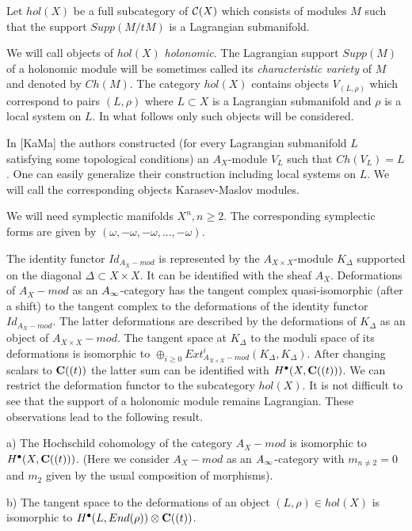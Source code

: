 \documentclass[a4paper,12pt]{article}
\begin{document}
Let $hol(X)$ be a full subcategory of ${\cal C}(X)$
which consists of modules $M$ such that the support $Supp(M/tM)$ is
a Lagrangian submanifold.

We will call objects of $hol(X)$ 
{\it holonomic}.
The Lagrangian support $Supp(M)$ of a holonomic module will be sometimes called its
{\it characteristic
variety} of $M$ and denoted by $Ch(M)$. The 
category $hol(X)$  contains
objects  $V_{(L,\rho)}$ which correspond to pairs
$(L,\rho)$ where $L\subset X$ is a Lagrangian submanifold and
$\rho$ is a local system on $L$. In what follows only such objects
will be considered. 

\begin{rmk}
 In [KaMa] the authors constructed (for every Lagrangian submanifold $L$ satisfying
some topological conditions)
an $A_X$-module $V_L$ such that $Ch(V_L)=L$. 
One can easily generalize their construction including local systems on $L$.
We will call the corresponding objects
Karasev-Maslov modules.

\end{rmk}

We will  need symplectic manifolds $X^n, n\ge 2$. The corresponding symplectic forms
are given by $(\omega,-\omega,-\omega,...,-\omega)$.


The identity functor $Id_{A_X-mod}$ is represented by the  $A_{X\times X}$-module
$K_{\Delta}$  supported on the diagonal $\Delta\subset X\times X$.
It can be  identified with the sheaf  $A_X$.
Deformations of $A_X-mod$ as an $A_{\infty}$-category has the tangent complex
quasi-isomorphic (after a shift) to the tangent
complex to the  deformations of the identity functor $Id_{A_X-mod}$.
The latter deformations are described by the deformations
of $K_{\Delta}$ as an object of $A_{X\times X}-mod$.  The tangent space at  $K_{\Delta}$
 to the moduli space of its 
deformations is isomorphic to $\oplus_{i\ge 0}Ext_{A_{X\times X}-mod}^i(K_{\Delta},K_{\Delta})$.
After changing scalars to ${\bf C}((t))$ the latter sum can be identified with $H^{\bullet}(X,{\bf C}((t)))$.
We can restrict the deformation functor to the subcategory $hol(X)$. It is not difficult
to see that the support of a holonomic module remains Lagrangian. 
These observations lead to the following result.


\begin{prp} 
a) The Hochschild cohomology of the category 
$A_X-mod$ is isomorphic to  $H^{\bullet}(X,{\bf C}((t)))$.
(Here we consider $A_X-mod$ as an $A_{\infty}$-category with $m_{n\ne 2}=0$ and $m_2$ given
by the usual composition of morphisms).

b) The tangent space to the deformations of an object $(L,\rho)\in hol(X)$ is
isomorphic to  $H^{\bullet}(L,End(\rho))\otimes {\bf C}((t))$.

\end{prp}
\end{document}
